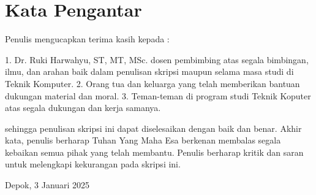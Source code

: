 \chapter*{Kata Pengantar}
Penulis mengucapkan terima kasih kepada :

    1. Dr. Ruki Harwahyu, ST, MT, MSc. dosen pembimbing atas segala bimbingan, ilmu, dan arahan baik dalam penulisan skripsi maupun selama masa studi di Teknik Komputer.
    2. Orang tua dan keluarga yang telah memberikan bantuan dukungan material dan moral.
    3. Teman-teman di program studi Teknik Koputer atas segala dukungan dan kerja samanya.

sehingga penulisan skripsi ini dapat diselesaikan dengan baik dan benar. Akhir kata, penulis  berharap Tuhan Yang Maha Esa berkenan membalas segala kebaikan semua pihak yang telah membantu. Penulis berharap kritik dan saran untuk melengkapi kekurangan pada skripsi ini.


\vspace*{0.1cm}
\begin{flushright}
	Depok, 3 Januari 2025\\[0.1cm]
	\vspace*{1cm}
	\penulis

\end{flushright}
